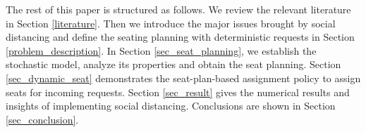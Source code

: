 The rest of this paper is structured as follows. We review the relevant literature in Section \ref{literature}. Then we introduce the major issues brought by social distancing and define the seating planning with deterministic requests in Section \ref{problem_description}. In Section \ref{sec_seat_planning}, we establish the stochastic model, analyze its properties and obtain the seat planning. Section \ref{sec_dynamic_seat} demonstrates the seat-plan-based assignment policy to assign seats for incoming requests. Section \ref{sec_result} gives the numerical results and insights of implementing social distancing. Conclusions are shown in Section \ref{sec_conclusion}.
